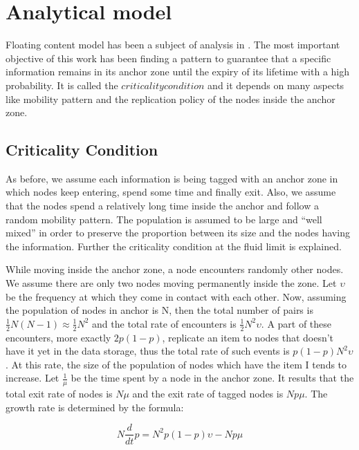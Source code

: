 \section {Analytical model}

Floating content model has been a subject of analysis in
\cite{whendoesdatafloats} . The most important objective of this work has been
finding a pattern to guarantee that a specific information remains in its anchor
zone until the expiry of its lifetime with a high probability. It is called the
$criticality condition$ and it depends on many aspects like mobility pattern and
the replication policy of the nodes inside the anchor zone. 

\subsection{Criticality Condition}

As before, we assume each information is being tagged with an anchor zone in
which nodes keep entering, spend some time and finally exit. Also, we assume
that the nodes spend a relatively long time inside the anchor and follow a
random mobility pattern. The population is assumed to be large and ``well
mixed'' in order to preserve the proportion between its size and the nodes
having the information. Further the criticality condition at the
fluid limit is explained.

While moving inside the anchor zone, a node encounters randomly other nodes.
We assume there are only two nodes moving permanently inside the zone. Let
$\upsilon$ be the frequency at which they come in contact with each other. Now,
assuming the population of nodes in anchor is N, then the total number of pairs
is $\frac{1}{2}N(N-1) \approx \frac{1}{2}N^2$ and the total rate of encounters
is $\frac{1}{2}N^2\upsilon$. A part of these encounters, more exactly $2p(1-p)$,
replicate an item to nodes that doesn't have it yet in the data storage, thus
the total rate of such events is $p(1-p)N^2\upsilon$. At this rate, the size of
the population of nodes which have the item I tends to increase. Let
$\frac{1}{\mu}$ be the time spent by a node in the anchor zone. It results that
the total exit rate of nodes is $N\mu$ and the exit rate of tagged nodes is
$Np\mu$. The growth rate is determined by the formula:

\begin{equation}
N\frac{d}{dt}p = N^2p(1-p)\upsilon - Np\mu \label{eq:derivative}
\end{equation}


